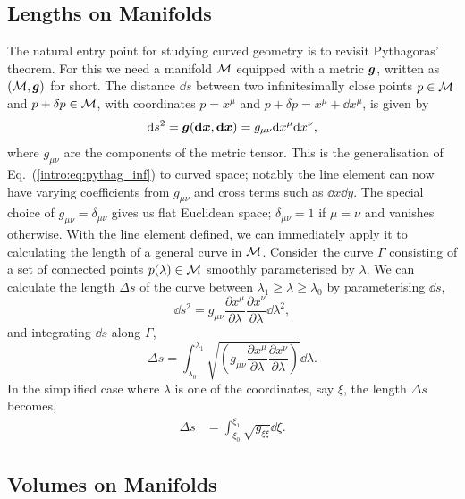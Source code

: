 \subsection{Lengths on Manifolds}\label{intro:sect:lgm}
The natural entry point for studying curved geometry is to revisit Pythagoras' theorem. For this we need a manifold $\mathcal{M}$ equipped with a metric $\boldsymbol{g}$, written as $(\mathcal{M},\boldsymbol{g})$ for short. The distance $\dd s$ between two infinitesimally close points $p\in\mathcal{M}$ and $p+\delta p \in \mathcal{M}$, with coordinates $p=x^\mu$ and $p+\delta p = x^\mu + \dd x^\mu$, is given by
\begin{equation}
\dd s^2 = \boldsymbol{g}(\boldsymbol{\mathrm{d}}\boldsymbol{x},\boldsymbol{\mathrm{d}}\boldsymbol{x}) =  g_{\mu\nu}\dd x^\mu \dd x^\nu,
\end{equation}
where $g_{\mu\nu}$ are the components of the metric tensor. This is the generalisation of Eq.~(\ref{intro:eq:pythag_inf}) to curved space; notably the line element can now have varying coefficients from $g_{\mu\nu}$ and cross terms such as $\dd x \dd y$. The special choice of $g_{\mu\nu} = \delta_{\mu\nu}$ gives us flat Euclidean space; $\delta_{\mu\nu}=1$ if $\mu=\nu$ and vanishes otherwise. With the line element defined, we can immediately apply it to calculating the length of a general curve in $\mathcal{M}$. Consider the curve $\Gamma$ consisting of a set of connected points $p(\lambda)\in\mathcal{M}$ smoothly parameterised by $\lambda$. We can calculate the length $\Delta s$ of the curve between $\lambda_1 \geq\lambda\geq\lambda_0$ by parameterising $\dd s$,
\begin{equation}
\dd s ^2 = g_{\mu\nu}\frac{\partial x^\mu}{\partial \lambda}\frac{\partial x^\nu}{\partial \lambda}\dd \lambda^2,
\end{equation}
and integrating $\dd s$ along $\Gamma$,
\begin{equation}
\label{intro:eq:Delta_s}\Delta s = \int_{\lambda_0}^{\lambda_1}\sqrt{\left(g_{\mu\nu}\frac{\partial x^\mu}{\partial \lambda}\frac{\partial x^\nu}{\partial \lambda}\right)}\dd \lambda.
\end{equation}
In the simplified case where $\lambda$ is one of the coordinates, say $\xi$, the length $\Delta s$ becomes,
\begin{align} \label{intro:eq:coord_interval_length}
\Delta s &= \int_{\xi_0}^{\xi_1}\sqrt{g_{\xi\xi}}\dd \xi.
\end{align}




\subsection{Volumes on Manifolds}

